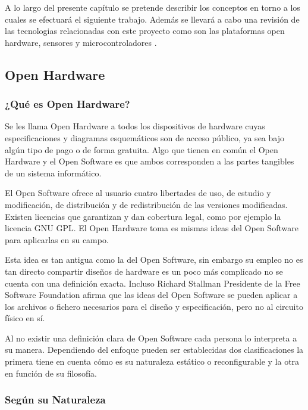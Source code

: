 
A lo largo del presente capítulo se pretende describir los conceptos en torno a los cuales se efectuará el siguiente trabajo. Además se llevará a cabo una revisión de las  tecnologias relacionadas con este proyecto como  son las  plataformas open hardware, sensores y microcontroladores .\\

\subsection{Open Hardware}
\subsubsection{¿Qué es Open Hardware?}
Se les llama Open Hardware a todos los dispositivos de hardware cuyas especificaciones y diagramas esquemáticos son de acceso público, ya sea bajo algún tipo de pago o de forma gratuita. Algo que tienen en común el Open Hardware y el Open Software es que ambos corresponden a las partes tangibles de un sistema informático.

El Open Software ofrece al usuario cuatro libertades de uso, de estudio  y modificación, de  distribución y de redistribución de las versiones modificadas. Existen licencias que  garantizan y dan cobertura legal,  como  por  ejemplo  la  licencia  GNU GPL. El Open Hardware toma es mismas ideas del Open Software para aplicarlas en su campo.\cite{Osh14}

Esta idea es tan antigua  como la  del Open Software, sin embargo  su  empleo no es tan directo compartir  diseños  de  hardware  es  un poco  más  complicado no se cuenta  con una definición exacta. Incluso Richard Stallman Presidente de la  Free Software Foundation afirma  que  las  ideas del Open Software  se  pueden  aplicar  a los archivos  o fichero necesarios  para el diseño y especificación, pero no  al circuito físico  en  sí.  

Al no existir una  definición clara de Open Software cada persona  lo  interpreta  a su manera. Dependiendo  del  enfoque  pueden  ser  establecidas dos clasificaciones  la primera  tiene en cuenta  cómo es  su naturaleza estático o  reconfigurable  y la  otra   en función  de  su filosofía.

\subsubsection*{Según su Naturaleza}

